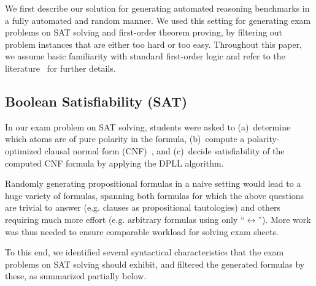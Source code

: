 We first describe our solution for generating automated reasoning
benchmarks in a fully automated and random manner. We used this
setting for generating exam problems on SAT solving and first-order
theorem proving, by 
filtering out problem instances that are either too
hard or too easy. Throughout this paper, we assume basic familiarity with standard first-order
logic and refer to the literature~\cite{SAT09,Vampire13} for further details.


\subsection{Boolean Satisfiability (SAT)}\label{sec:sat}

In our exam problem on SAT solving, students were asked to
(a)~determine which atoms are of pure polarity in the formula,
(b)~compute a polarity-optimized clausal normal form (CNF)~\cite{Tseytin70},
and (c)~decide satisfiability of the computed CNF formula by applying the DPLL algorithm.

Randomly generating propositional formulas in a naive setting would lead
to a huge variety of formulas,
spanning both formulas for which the above questions %
are trivial to answer (e.g. clauses as propositional tautologies)
and others requiring much more effort
(e.g. arbitrary formulas using only ``$\leftrightarrow$'').
More work was thus needed to
ensure comparable workload for solving exam sheets.

To this end, we identified several  syntactical characteristics
that the exam problems on SAT solving should exhibit,
and filtered the generated formulas by these, as summarized  partially
below.
\smallskip
%

